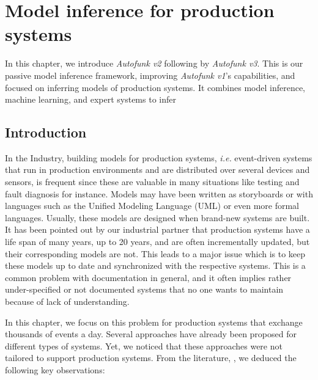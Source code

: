 \chapter{Model inference for production systems}
\label{sec:modelinf:prodsystems}

In this chapter, we introduce \emph{Autofunk v2} following by
\emph{Autofunk v3}. This is our passive model inference
framework, improving \emph{Autofunk v1}'s capabilities, and
focused on inferring models of production systems. It combines
model inference, machine learning, and expert systems to infer \\

\minitoc

\pagebreak

\section{Introduction}

In the Industry, building models for production systems,
\emph{i.e.} event-driven systems that run in production
environments and are distributed over several devices and
sensors, is frequent since these are valuable in many situations
like testing and fault diagnosis for instance. Models may have
been written as storyboards or with languages such as the Unified
Modeling Language (UML) or even more formal languages. Usually,
these models are designed when brand-new systems are built. It
has been pointed out by our industrial partner that production
systems have a life span of many years, up to 20 years, and are
often incrementally updated, but their corresponding models are
not.  This leads to a major issue which is to keep these models
up to date and synchronized with the respective systems. This is
a common problem with documentation in general, and it often
implies rather under-specified or not documented systems that no
one wants to maintain because of lack of understanding.

In this chapter, we focus on this problem for production systems
that exchange thousands of events a day. Several approaches have
already been proposed for different types of systems.  Yet, we
noticed that these approaches were not tailored to support
production systems. From the literature,
, we deduced the
following key observations:

